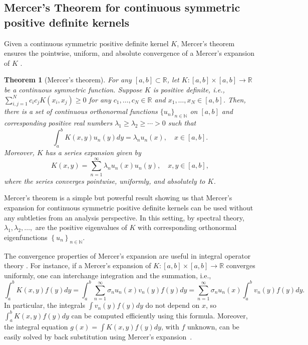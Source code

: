 \documentclass{article}
\newtheorem{theorem}{Theorem}
\begin{document}
\subsection{Mercer's Theorem for continuous symmetric positive definite kernels}
Given a continuous symmetric positive definite kernel $K$, Mercer's theorem ensures the pointwise, uniform, and absolute convergence of a Mercer's expansion of $K$ \citep{mercer1909xvi}.

\begin{theorem}[Mercer's theorem]
For any $[a,b]\subset\mathbb{R}$, let $K:[a,b]\times [a,b]\to\mathbb{R}$ be a continuous symmetric function. Suppose $K$ is positive definite, i.e., $\sum_{i,j=1}^Nc_ic_jK(x_i, x_j)\geq 0$ for any $c_1, \dots, c_N\in\mathbb{R}$ and $x_1, \dots, x_N\in[a,b]$. Then, there is a set of continuous orthonormal functions $\{u_n\}_{n\in\mathbb{N}}$ on $[a,b]$ and corresponding positive real numbers $\lambda_1\geq \lambda_2\geq \cdots >0$ such that 
\begin{equation*}
    \int_a^b K(x, y)u_n(y) dy = \lambda_n u_n(x), \quad x\in[a,b].
    \end{equation*} 
Moreover, $K$ has a series expansion given by 
\begin{equation}\label{eq:mercerseries}
    K(x, y) = \sum_{n=1}^\infty \lambda_n u_n(x)u_n(y),\quad x, y\in[a,b],
\end{equation}
where the series converges pointwise, uniformly, and absolutely to $K$. 
\label{thm:Mercer}
\end{theorem}

\par Mercer's theorem is a simple but powerful result showing us that Mercer's expansion for continuous symmetric positive definite kernels can be used without any subtleties from an analysis perspective. In this setting, by spectral theory, $\lambda_1,\lambda_2,\ldots,$ are the positive eigenvalues of $K$ with corresponding orthonormal eigenfunctions $\left\{u_n\right\}_{n\in\mathbb{N}}$.

The convergence properties of Mercer's expansion are useful in integral operator theory \citep{stewart2011fredholm}. For instance, if a Mercer's expansion of $K:[a,b]\times [a,b]\rightarrow\mathbb{R}$  converges uniformly, one can interchange integration and the summation, i.e.,
\begin{equation*}
    \int_a^b K(x, y)f(y)dy = \int_a^b \sum_{n=1}^\infty \sigma_n u_n(x)v_n(y) f(y) dy = \sum_{n=1}^\infty \sigma_n u_n(x) \int_a^b v_n(y)f(y) dy.
\end{equation*}
In particular, the integrals $\int v_n(y)f(y)dy$ do not depend on $x$, so $\int_a^b K(x, y)f(y)dy$ can be computed efficiently using this formula. Moreover, the integral equation $g(x) = \int K(x,y) f(y)dy$, with $f$ unknown, can be easily solved by back substitution using Mercer's expansion~\citep{schmidt1907theorie}.
\end{document}
